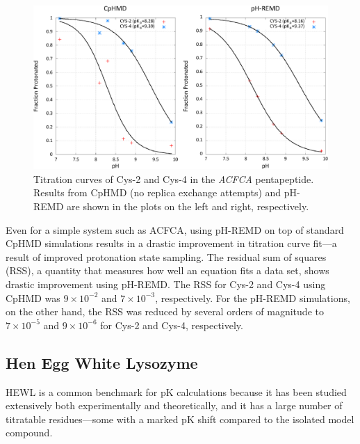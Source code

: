 \begin{figure}
   \includegraphics[width=6.5in]{ACFCA_Titration_Curves.eps}
   \caption{Titration curves of Cys-2 and Cys-4 in the \emph{ACFCA}
            pentapeptide. Results from CpHMD (no replica exchange attempts) and
            pH-REMD are shown in the plots on the left and right, respectively.}
   \label{fig4:acfca_titration_curves}
\end{figure}

Even for a simple system such as ACFCA, using pH-REMD on top of standard CpHMD
simulations results in a drastic improvement in titration curve fit---a result
of improved protonation state sampling. The residual sum of squares (RSS), a
quantity that measures how well an equation fits a data set, shows drastic
improvement using pH-REMD. The RSS for Cys-2 and Cys-4 using CpHMD was $9 \times
10 ^ {-2}$ and $7 \times 10 ^ {-3}$, respectively. For the pH-REMD simulations,
on the other hand, the RSS was reduced by several orders of magnitude to $7
\times 10 ^ {-5}$ and $9 \times 10 ^ {-6}$ for Cys-2 and Cys-4, respectively.

\subsection{Hen Egg White Lysozyme}

HEWL is a common benchmark for pK calculations because it has been
studied extensively both experimentally
\cite{Takahashi_Biopolymers_1992_v32_p897, Bartik_BiophysJ_1994_v66_p1180,
Webb_Proteins_2011_v79_p685} and theoretically,
\cite{Mongan_JComputChem_2004_v25_p2038, Demchuk_JPhysChem_1996_v100_p17373,
Williams_JChemTheoryComput_2010_v6_p560, Machuqueiro_Proteins_2008_v72_p289,
Swails_JChemTheoryComput_2012_v8_p4393, Wallace_JChemTheoryComput_2011_v7_p2617}
and it has a large number of titratable residues---some with a marked pK
shift compared to the isolated model compound.


